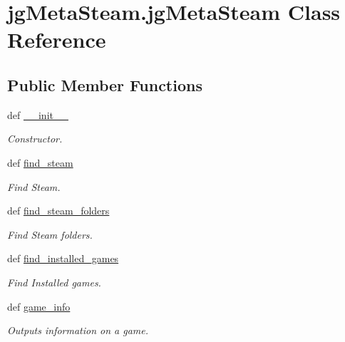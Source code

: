 \hypertarget{classjg_meta_steam_1_1jg_meta_steam}{\section{jg\+Meta\+Steam.\+jg\+Meta\+Steam Class Reference}
\label{classjg_meta_steam_1_1jg_meta_steam}
}
\subsection*{Public Member Functions}
\begin{DoxyCompactItemize}
\item 
def \hyperlink{classjg_meta_steam_1_1jg_meta_steam_ad3d04fc5360a44886ed02ab880b707a6}{\+\_\+\+\_\+init\+\_\+\+\_\+}
\begin{DoxyCompactList}\small\item\em Constructor. \end{DoxyCompactList}\item 
def \hyperlink{classjg_meta_steam_1_1jg_meta_steam_a97c8958b3b9001311f3d8db72a53aed6}{find\+\_\+steam}
\begin{DoxyCompactList}\small\item\em Find Steam. \end{DoxyCompactList}\item 
def \hyperlink{classjg_meta_steam_1_1jg_meta_steam_a0025e9651a585e72497ef573e8affff2}{find\+\_\+steam\+\_\+folders}
\begin{DoxyCompactList}\small\item\em Find Steam folders. \end{DoxyCompactList}\item 
def \hyperlink{classjg_meta_steam_1_1jg_meta_steam_a7a24df89251f15797f7ce68964171257}{find\+\_\+installed\+\_\+games}
\begin{DoxyCompactList}\small\item\em Find Installed games. \end{DoxyCompactList}\item 
def \hyperlink{classjg_meta_steam_1_1jg_meta_steam_ac94a7cacc15ac4fa560ddc4d72c492b6}{game\+\_\+info}
\begin{DoxyCompactList}\small\item\em Outputs information on a game. \end{DoxyCompactList}\end{DoxyCompactItemize}


